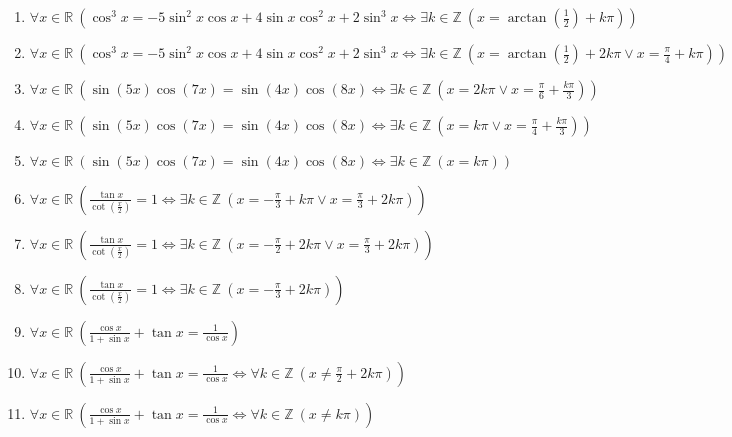 \documentclass[11pt,a4paper]{article}
\begin{document}
\begin{enumerate}
\item $\displaystyle \forall x \in \mathbb{R}\ \left( \cos^{3} x = -5\sin^{2} x \cos x + 4\sin x \cos^{2} x + 2\sin^{3} x \iff \exists k \in \mathbb{Z}\ \left( x = \arctan\left(\frac{1}{2}\right) + k\pi \right) \right)$
\item $\displaystyle \forall x \in \mathbb{R}\ \left( \cos^{3} x = -5\sin^{2} x \cos x + 4\sin x \cos^{2} x + 2\sin^{3} x \iff \exists k \in \mathbb{Z}\ \left( x = \arctan\left(\frac{1}{2}\right) + 2k\pi \lor x = \frac{\pi}{4} + k\pi \right) \right)$
\item $\displaystyle \forall x \in \mathbb{R}\ \left( \sin\left(5x\right)\cos\left(7x\right) = \sin\left(4x\right)\cos\left(8x\right) \iff \exists k \in \mathbb{Z}\ \left( x = 2k\pi \lor x = \frac{\pi}{6} + \frac{k\pi}{3} \right) \right)$
\item $\displaystyle \forall x \in \mathbb{R}\ \left( \sin\left(5x\right)\cos\left(7x\right) = \sin\left(4x\right)\cos\left(8x\right) \iff \exists k \in \mathbb{Z}\ \left( x = k\pi \lor x = \frac{\pi}{4} + \frac{k\pi}{3} \right) \right)$
\item $\displaystyle \forall x \in \mathbb{R}\ \left( \sin\left(5x\right)\cos\left(7x\right) = \sin\left(4x\right)\cos\left(8x\right) \iff \exists k \in \mathbb{Z}\ \left( x = k\pi \right) \right)$
\item $\displaystyle \forall x \in \mathbb{R}\ \left( \frac{\tan x}{\cot\left(\frac{x}{2}\right)} = 1 \iff \exists k \in \mathbb{Z}\ \left( x = -\frac{\pi}{3} + k\pi \lor x = \frac{\pi}{3} + 2k\pi \right) \right)$
\item $\displaystyle \forall x \in \mathbb{R}\ \left( \frac{\tan x}{\cot\left(\frac{x}{2}\right)} = 1 \iff \exists k \in \mathbb{Z}\ \left( x = -\frac{\pi}{2} + 2k\pi \lor x = \frac{\pi}{3} + 2k\pi \right) \right)$
\item $\displaystyle \forall x \in \mathbb{R}\ \left( \frac{\tan x}{\cot\left(\frac{x}{2}\right)} = 1 \iff \exists k \in \mathbb{Z}\ \left( x = -\frac{\pi}{3} + 2k\pi \right) \right)$
\item $\displaystyle \forall x \in \mathbb{R}\ \left( \frac{\cos x}{1 + \sin x} + \tan x = \frac{1}{\cos x} \right)$
\item $\displaystyle \forall x \in \mathbb{R}\ \left( \frac{\cos x}{1 + \sin x} + \tan x = \frac{1}{\cos x} \iff \forall k \in \mathbb{Z}\ \left( x \neq \frac{\pi}{2} + 2k\pi \right) \right)$
\item $\displaystyle \forall x \in \mathbb{R}\ \left( \frac{\cos x}{1 + \sin x} + \tan x = \frac{1}{\cos x} \iff \forall k \in \mathbb{Z}\ \left( x \neq k\pi \right) \right)$

\end{enumerate}
\end{document}
